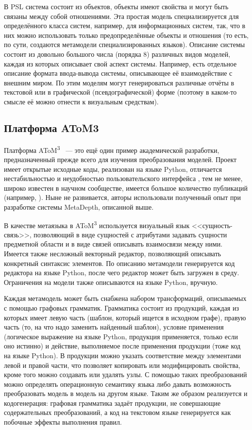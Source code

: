 В PSL система состоит из объектов, объекты имеют свойства и могут быть связаны между 
собой отношениями. Эта простая модель специализируется для определённого класса систем, 
например, для информационных систем, так, что в них можно использовать только предопределённые 
объекты и отношения (то есть, по сути, создаются метамодели специализированных языков). 
Описание системы состоит из довольно большого числа (порядка 8) различных видов моделей, 
каждая из которых описывает свой аспект системы. Например, есть отдельное описание формата ввода-вывода 
системы, описывающее её взаимодействие с внешним миром. По этим моделям могут генерироваться 
различные отчёты в текстовой или в графической (псевдографической) форме (поэтому в каком-то смысле
её можно отнести к визуальным средствам).

\subsection{Платформа AToM3}
Платформа AToM\textsuperscript{3}~\cite{atom3} --- это ещё один пример академической разработки, 
предназначенный прежде всего для изучения преобразования моделей. Проект имеет открытые 
исходные коды, реализован на языке Python, отличается нестабильностью и неудобностью пользовательского интерфейса%
, тем не менее, широко известен в научном сообществе, имеется большое количество публикаций (например, \cite{vangheluwe2004domain}).
Ныне не развивается, авторы использовали полученный опыт при разработке системы MetaDepth, описанной выше.

В качестве метаязыка в AToM\textsuperscript{3} используется визуальный язык <<сущность-связь>>, позволяющий в виде 
сущностей с атрибутами задавать сущности предметной области и в виде связей описывать 
взаимосвязи между ними. Имеется также несложный векторный редактор, позволяющий описывать 
конкретный синтаксис элементов. По описанию метамодели генерируется код редактора 
на языке Python, после чего редактор может быть загружен в среду. Ограничения на модели
также описываются на языке Python, вручную.

Каждая метамодель может быть снабжена набором трансформаций, описываемых с помощью 
графовых грамматик. Грамматика состоит из продукций, каждая из которых имеет левую 
часть (шаблон, который ищется в исходном графе), правую часть (то, на что надо заменить 
найденный шаблон), условие применения (логическое выражение на языке Python, продукция 
применяется, только если оно истинно) и действие, выполняемое после применения продукции 
(тоже код на языке Python). В продукции можно указать соответствие между элементами 
левой и правой части, что позволяет копировать или модифицировать свойства, кроме 
того можно создавать или удалять узлы. С помощью таких преобразований можно определять 
операционную семантику языка либо давать возможность преобразовать модель в модель 
на другом языке. Таким же образом реализуется и кодогенерация: графовая грамматика 
задаёт продукции, не совершающие содержательных преобразований, а код на текстовом 
языке генерируется как побочные эффекты выполнения правил.

